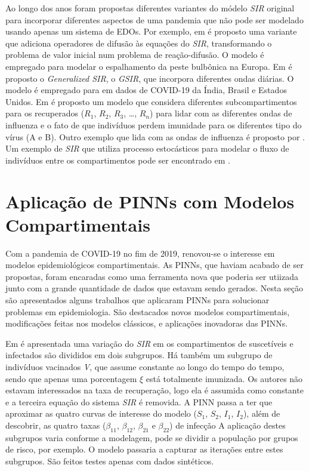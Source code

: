 Ao longo dos anos foram propostas diferentes variantes do módelo \textit{SIR} 
original para incorporar diferentes aspectos de uma pandemia que não pode ser 
modelado usando apenas um sistema de EDOs.
Por exemplo, em \cite{noble:1974-sir-difusao} é proposto uma variante que adiciona 
operadores de difusão às equações do \textit{SIR}, transformando o problema de valor
inicial num problema de reação-difusão. 
O modelo é empregado para modelar o espalhamento da peste bulbônica na Europa.     
Em \cite{singh-gupta:2022-generalized-sir} é proposto o \textit{Generalized SIR}, 
o \textit{GSIR}, que incorpora diferentes ondas diárias. O modelo é empregado para 
em dados de COVID-19 da Índia, Brasil e Estados Unidos.
Em \cite{andreu-vilarroig-etal:2025-sugestao-beta-t} é proposto um modelo que 
considera diferentes subcompartimentos para os recuperados 
($R_1$, $R_2$, $R_3$, \dots, $R_n$) para lidar com as diferentes ondas de influenza 
e o fato de que indivíduos perdem imunidade para os diferentes tipo do vírus (A e B). 
Outro exemplo que lida com as ondas de influenza é proposto por 
\cite{lin:2003-sir-influenza}.
Um exemplo de \textit{SIR} que utiliza processo estocásticos para modelar o fluxo
de indivíduos entre os compartimentos pode ser encontrado em 
\cite{krylova:2013-sir-erlang}.
    

\section{Aplicação de PINNs com Modelos Compartimentais}

Com a pandemia de COVID-19 no fim de 2019, renovou-se o interesse em modelos
epidemiológicos compartimentais. As PINNs, que haviam acabado de ser propostas,
foram encaradas como uma ferramenta nova que poderia ser utiizada junto com 
a grande quantidade de dados que estavam sendo gerados. 
Nesta seção são apresentados alguns trabalhos que aplicaram PINNs para solucionar
problemas em epidemiologia. São destacados novos modelos compartimentais, 
modificações feitas nos modelos clássicos, e aplicações inovadoras das PINNs.  

Em \cite{ouyoussef-etal:24-subcompartimentos} é apresentada uma variação
do \textit{SIR} em os compartimentos de suscetíveis e infectados 
são divididos em dois subgrupos. Há também um subgrupo de indivíduos 
vacinados \textit{V}, que assume constante ao longo do tempo do tempo, 
sendo que apenas uma porcentagem $\xi$ está totalmente imunizada.
Os autores não estavam interessados na taxa de recuperação, logo ela é assumida
como constante e a terceira equação do sistema \textit{SIR} é removida. 
A PINN passa a ter que aproximar as quatro curvas de interesse do modelo 
($S_1$, $S_2$, $I_1$, $I_2$), 
além de descobrir, as quatro taxas 
($\beta_{11}$, $\beta_{12}$, $\beta_{21}$ e $\beta_{22}$) de infecção
A aplicação destes subgrupos varia conforme a modelagem, 
pode se dividir a população por grupos de risco, por exemplo.
O modelo passaria a capturar as iterações entre estes subgrupos.
São feitos testes apenas com dados sintéticos. 

